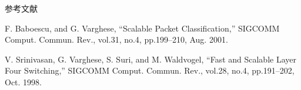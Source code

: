 \documentclass[a4paper,10pt]{jarticle}
\begin{document}
\begin{frame}{参考文献}

{\scriptsize
\begin{thebibliography}{99}
\setlength{\itemsep}{-.5zw}
\beamertemplatetextbibitems

 F. Baboescu, and G. Varghese, “Scalable Packet Classification,” SIGCOMM Comput. Commun. Rev., vol.31, no.4, pp.199–210, Aug. 2001. 
\vspace{5mm}

 V. Srinivasan, G. Varghese, S. Suri, and M. Waldvogel, “Fast and Scalable Layer Four Switching,” SIGCOMM Comput. Commun. Rev., vol.28, no.4, pp.191–202, Oct. 1998.

\end{thebibliography}
}

\end{frame}
\end{document}

